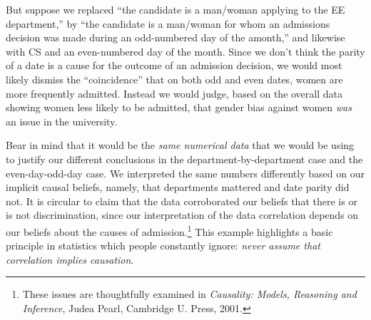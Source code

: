 But suppose we replaced ``the candidate is a man/woman applying to the
EE department,'' by ``the candidate is a man/woman for whom an
admissions decision was made during an odd-numbered day of the
amonth,'' and likewise with CS and an even-numbered day of the month.
Since we don't think the parity of a date is a cause for the outcome
of an admission decision, we would most likely dismiss the
``coincidence'' that on both odd and even dates, women are more
frequently admitted.  Instead we would judge, based on the overall
data showing women less likely to be admitted, that gender bias
against women \emph{was} an issue in the university.

Bear in mind that it would be the \emph{same numerical data} that we
would be using to justify our different conclusions in the
department-by-department case and the even-day-odd-day case.  We
interpreted the same numbers differently based on our implicit causal
beliefs, namely, that departments mattered and date parity did not.
It is circular to claim that the data corroborated our beliefs that
there is or is not discrimination, since our interpretation of the
data correlation depends on our beliefs about the causes of
admission.\footnote{These issues are thoughtfully examined in
  \emph{Causality: Models, Reasoning and Inference}, Judea Pearl,
  Cambridge U. Press, 2001.}  This example highlights a basic
principle in statistics which people constantly ignore: \emph{never
  assume that correlation implies causation}.

